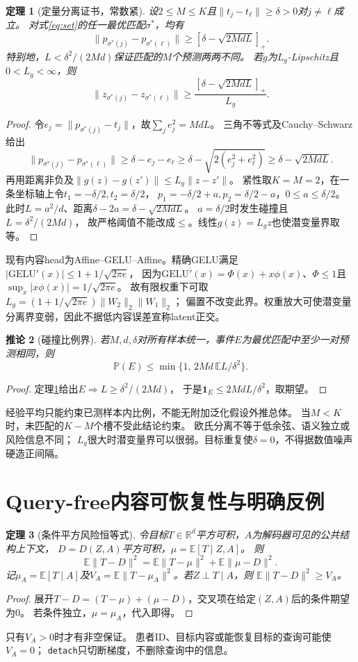 \documentclass[UTF8,fontset=fandol,11pt,a4paper]{ctexart}
\newtheorem{theorem}{定理}[section]
\newtheorem{corollary}[theorem]{推论}
\theoremstyle{remark}
\newcommand{\E}{\mathbb E}
\newcommand{\Prob}{\mathbb P}
\newcommand{\R}{\mathbb R}
\newcommand{\ind}{\mathbf 1}
\newcommand{\relu}[1]{[#1]_+}
\begin{document}
\begin{theorem}[定量分离证书，常数紧]\label{th:separation}
设$2\le M\le K$且$\|t_j-t_\ell\|\ge\delta>0$对$j\ne\ell$成立。
对式\eqref{eq:set}的任一最优匹配$\sigma^*$，均有
\begin{equation}\label{eq:sep}
 \|p_{\sigma^*(j)}-p_{\sigma^*(\ell)}\|
 \ge \relu{\delta-\sqrt{2MdL}}.
\end{equation}
特别地，$L<\delta^2/(2Md)$保证匹配的$M$个预测两两不同。
若$g$为$L_g$-Lipschitz且$0<L_g<\infty$，则
\[
 \|z_{\sigma^*(j)}-z_{\sigma^*(\ell)}\|
 \ge\frac{\relu{\delta-\sqrt{2MdL}}}{L_g}.
\]
\end{theorem}
\begin{proof}
令$e_j=\|p_{\sigma^*(j)}-t_j\|$，故$\sum_je_j^2=MdL$。
三角不等式及Cauchy--Schwarz给出
\[
 \|p_{\sigma^*(j)}-p_{\sigma^*(\ell)}\|
 \ge\delta-e_j-e_\ell
 \ge\delta-\sqrt{2(e_j^2+e_\ell^2)}
 \ge\delta-\sqrt{2MdL}.
\]
再用距离非负及$\|g(z)-g(z')\|\le L_g\|z-z'\|$。
紧性取$K=M=2$，在一条坐标轴上令$t_1=-\delta/2,t_2=\delta/2$，
$p_1=-\delta/2+a,p_2=\delta/2-a$，$0\le a\le\delta/2$。
此时$L=a^2/d$、距离$\delta-2a=\delta-\sqrt{2MdL}$。
$a=\delta/2$时发生碰撞且$L=\delta^2/(2Md)$，
故严格阈值不能改成$\le$。线性$g(z)=L_gz$也使潜变量界取等。
\end{proof}
现有内容head为Affine--GELU--Affine。精确GELU满足
$|\mathrm{GELU}'(x)|\le1+1/\sqrt{2\pi e}$，
因为$\mathrm{GELU}'(x)=\Phi(x)+x\phi(x)$、$\Phi\le1$且
$\sup_x|x\phi(x)|=1/\sqrt{2\pi e}$。
故有限权重下可取$L_g=(1+1/\sqrt{2\pi e})\|W_2\|_2\|W_1\|_2$；
偏置不改变此界。权重放大可使潜变量分离界变弱，因此不据低内容误差宣称latent正交。
\begin{corollary}[碰撞比例界]
若$M,d,\delta$对所有样本统一，事件$E$为最优匹配中至少一对预测相同，则
\[
 \Prob(E)\le\min\{1,\,2Md\,\E L/\delta^2\}.
\]
\end{corollary}
\begin{proof}
定理\ref{th:separation}给出$E\Rightarrow L\ge\delta^2/(2Md)$，
于是$\ind_E\le2MdL/\delta^2$，取期望。
\end{proof}
经验平均只能约束已测样本内比例，不能无附加泛化假设外推总体。
当$M<K$时，未匹配的$K-M$个槽不受此结论约束。
欧氏分离不等于低余弦、语义独立或风险信息不同；
$L_g$很大时潜变量界可以很弱。目标重复使$\delta=0$，不得据数值噪声硬造正间隔。

\section{Query-free内容可恢复性与明确反例}
\begin{theorem}[条件平方风险恒等式]\label{th:variance}
令目标$T\in\R^d$平方可积，$A$为解码器可见的公共结构上下文，
$D=D(Z,A)$平方可积，$\mu=\E[T\mid Z,A]$。
则
\[
 \E\|T-D\|^2=\E\|T-\mu\|^2+\E\|\mu-D\|^2.
\]
记$\mu_A=\E[T\mid A]$及$V_A=\E\|T-\mu_A\|^2$。若$Z\perp T\mid A$，则
$\E\|T-D\|^2\ge V_A$。
\end{theorem}
\begin{proof}
展开$T-D=(T-\mu)+(\mu-D)$，交叉项在给定$(Z,A)$后的条件期望为0。
若条件独立，$\mu=\mu_A$，代入即得。
\end{proof}
只有$V_A>0$时才有非空保证。
患者ID、目标内容或能恢复目标的查询可能使$V_A=0$；
\texttt{detach}只切断梯度，不删除查询中的信息。
\end{document}
